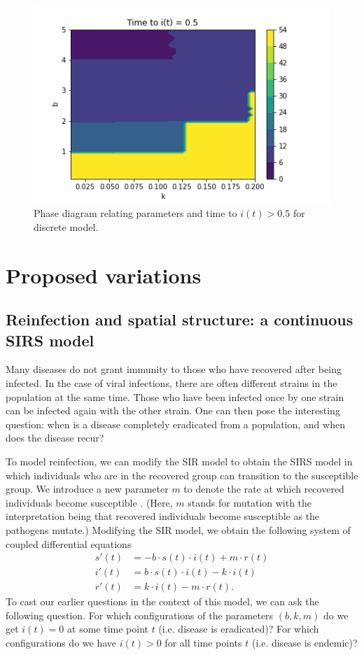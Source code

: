 \documentclass[12pt, reqno]{amsart}
\begin{document}
    \begin{figure}[h!]
        \centering
        \includegraphics[scale=0.8]{phase_outnumber_discrete.png}
        \caption{Phase diagram relating parameters and time to \(i(t) > 0.5\) for discrete model.}
        \label{fig:phase_transition_outnumber_discrete}
    \end{figure}
    \newpage
    
    \section{Proposed variations}

    \subsection{Reinfection and spatial structure: a continuous SIRS model}
    Many diseases do not grant immunity to those who have recovered after being infected. In the case of viral infections, there are often different strains in the population at the same time. Those who have been infected once by one strain can be infected again with the other strain. One can then pose the interesting question: when is a disease completely eradicated from a population, and when does the disease recur? 
    
    To model reinfection, we can modify the SIR model to obtain the SIRS model in which individuals who are in the recovered group can transition to the susceptible group. We introduce a new parameter \(m\) to denote the rate at which recovered individuals become susceptible \cite{brauerCompartmentalModelsEpidemiology2008}. (Here, \(m\) stands for mutation with the interpretation being that recovered individuals become susceptible as the pathogens mutate.) Modifying the SIR model, we obtain the following system of coupled differential equations 
    \begin{align*}
        s'(t) &= -b\cdot s(t) \cdot i(t) + m\cdot r(t) \\
        i'(t) &= b \cdot s(t) \cdot i(t) - k\cdot i(t) \\
        r'(t) &= k \cdot i(t) - m \cdot r(t).
    \end{align*}
    To cast our earlier questions in the context of this model, we can ask the following question. For which configurations of the parameters \((b,k,m)\) do we get \(i(t) = 0\) at some time point \(t\) (i.e. disease is eradicated)? For which configurations do we have \(i(t) > 0\) for all time points \(t\) (i.e. disease is endemic)?
\end{document}
